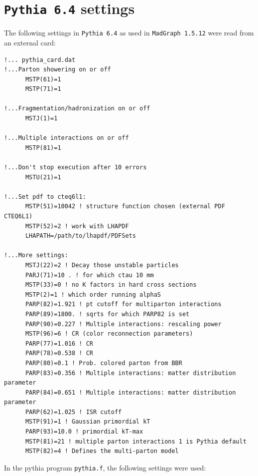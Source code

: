 \documentclass[12pt,A4paper]{article}
\begin{document}
\appendix
\appendixpage
\addappheadtotoc



\section{\texttt{Pythia 6.4} settings}
\label{appendix:pythia}
The following settings in \texttt{Pythia 6.4} as used in \texttt{MadGraph 1.5.12} were read from an external card:
\lstset{language=fortran}
\begin{lstlisting}
!... pythia_card.dat
!...Parton showering on or off
      MSTP(61)=1
      MSTP(71)=1

!...Fragmentation/hadronization on or off
      MSTJ(1)=1

!...Multiple interactions on or off
      MSTP(81)=1

!...Don't stop execution after 10 errors
      MSTU(21)=1

!...Set pdf to cteq6l1:
      MSTP(51)=10042 ! structure function chosen (external PDF CTEQ6L1)
      MSTP(52)=2 ! work with LHAPDF
      LHAPATH=/path/to/lhapdf/PDFSets

!...More settings:
      MSTJ(22)=2 ! Decay those unstable particles
      PARJ(71)=10 . ! for which ctau 10 mm
      MSTP(33)=0 ! no K factors in hard cross sections
      MSTP(2)=1 ! which order running alphaS
      PARP(82)=1.921 ! pt cutoff for multiparton interactions
      PARP(89)=1800. ! sqrts for which PARP82 is set
      PARP(90)=0.227 ! Multiple interactions: rescaling power
      MSTP(96)=6 ! CR (color reconnection parameters)
      PARP(77)=1.016 ! CR
      PARP(78)=0.538 ! CR
      PARP(80)=0.1 ! Prob. colored parton from BBR
      PARP(83)=0.356 ! Multiple interactions: matter distribution parameter
      PARP(84)=0.651 ! Multiple interactions: matter distribution parameter
      PARP(62)=1.025 ! ISR cutoff
      MSTP(91)=1 ! Gaussian primordial kT
      PARP(93)=10.0 ! primordial kT-max
      MSTP(81)=21 ! multiple parton interactions 1 is Pythia default
      MSTP(82)=4 ! Defines the multi-parton model
\end{lstlisting}
In the pythia program \texttt{pythia.f}, the following settings were used:
\end{document}
